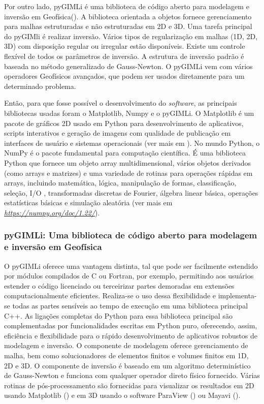 \documentclass[a4paper, 12 pt]{article} %
\begin{document}
Por outro lado, pyGIMLi é uma biblioteca de código aberto para modelagem e inversão em Geofísica(\citealp{Ruecker2017}). A biblioteca orientada a objetos fornece gerenciamento para malhas estruturadas e não estruturadas em 2D e 3D. Uma tarefa principal do pyGIMli é realizar inversão. Vários tipos de regularização em malhas (1D, 2D, 3D) com disposição regular ou irregular estão disponíveis. Existe um controle flexível de todos os parâmetros de inversão. A estrutura de inversão padrão é baseada no método generalizado de Gauss-Newton. O pyGIMLi vem com vários operadores Geofísicos avançados, que podem ser usados diretamente para um determinado problema.

Então, para que fosse possível o desenvolvimento do \textit{software}, as principais bibliotecas usadas foram o Matplotlib, Numpy e o pyGIMLi. O Matplotlib é um pacote de gráficos 2D usado em Python para desenvolvimento de aplicativos, scripts interativos e geração de imagens com qualidade de publicação em interfaces de usuário e sistemas operacionais (ver mais em \citealp{matplotlib}). No mundo Python, o NumPy é o pacote fundamental para computação científica. É uma biblioteca Python que fornece um objeto array multidimensional, vários objetos derivados (como arrays e matrizes) e uma variedade de rotinas para operações rápidas em arrays, incluindo matemática, lógica, manipulação de formas, classificação, seleção, I/O , transformadas discretas de Fourier, álgebra linear básica, operações estatísticas básicas e simulação aleatória (ver mais em \textit{\url{https://numpy.org/doc/1.22/}}).



\subsubsection{pyGIMLi: Uma biblioteca de código aberto para modelagem e inversão em Geofísica}

O pyGIMLi oferece uma vantagem distinta, tal que pode ser facilmente estendido por módulos compilados de C ou Fortran, por exemplo, permitindo aos usuários estender o código licenciado ou terceirizar partes demoradas em extensões computacionalmente eficientes. Realiza-se o uso dessa flexibilidade e implementa-se todas as partes sensíveis ao tempo de execução em uma biblioteca principal C++. As ligações completas do Python para essa biblioteca principal são complementadas por funcionalidades escritas em Python puro, oferecendo, assim, eficiência e flexibilidade para o rápido desenvolvimento de aplicativos robustos de modelagem e inversão. O componente de modelagem oferece gerenciamento de malha, bem como solucionadores de elementos finitos e volumes finitos em 1D, 2D e 3D. O componente de inversão é baseado em um algoritmo determinístico de Gauss-Newton e funciona com qualquer operador direto físico fornecido. Várias rotinas de pós-processamento são fornecidas para visualizar os resultados em 2D usando Matplotlib (\citealp{Ruecker2017}) e em 3D usando o software ParaView (\citealp{ayachit2015paraview}) ou Mayavi (\citealp{ramachandran2011mayavi}). 
\end{document}
